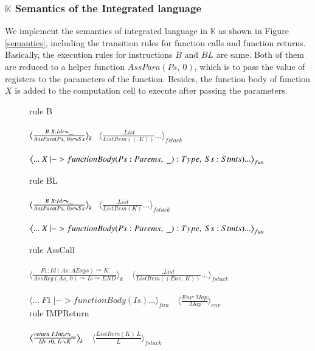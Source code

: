 \documentclass[letterpaper, 10 pt, conference]{IEEEtran}
\begin{document}
\subsubsection{$\mathbb{K}$ Semantics of the Integrated language}
\par We implement the semantics of integrated language in $\mathbb{K}$ as shown in Figure \ref{semantics}, including the transition rules for function calls and function returns. Basically, the execution rules for instructions $B$ and $BL$ are same. Both of them are reduced to a helper function $AssPara(Ps,~0)$, which is to pass the value of registers to the parameters of the function. Besides, the function body of function $X$ is added to the computation cell to execute after passing the parameters.
\begin{figure}
rule B\\ \\
$\big\langle\frac{B~X:Id\curvearrowright \underline{\hbox to 2mm{}}}{AssPara(Ps,~0)\curvearrowright Ss}\big\rangle_k$$~~~\big\langle\frac{.List}{ListItem((.K))}...\big\rangle_{fstack}$\\ \\
$\big\langle ...~ X ~|-> functionBody(Ps:Parems,~\underline{\hbox to 2mm{}}):Type,~Ss:Stmts) ...\big\rangle_{fun}\\$

rule BL\\ \\
$\big\langle\frac{B~X:Id\curvearrowright \underline{\hbox to 2mm{}}}{AssPara(Ps,~0)\curvearrowright Ss}\big\rangle_k$$~~~\big\langle\frac{.List}{ListItem(K)}...\big\rangle_{fstack}$\\ \\
$\big\langle ...~ X ~|-> functionBody(Ps:Parems,~\underline{\hbox to 2mm{}}):Type,~Ss:Stmts) ...\big\rangle_{fun}\\$

rule AssCall\\ \\
$\big\langle\frac{F1:Id(As:AExps)\curvearrowright K}{AssReg(As,~0)\curvearrowright Is\curvearrowright END}\big\rangle_k$
$~~~\big\langle\frac{.List}{ListItem((Env,~K))}...\big\rangle_{fstack}$\\ \\
$\big\langle ... ~F1~|->functionBody(Is) ...\big\rangle_{fun}$ $~~~\big\langle\frac{Env:Map}{.Map}\big\rangle_{env}$\\

rule IMPReturn\\ \\
$\big\langle\frac{return~I:Int;\curvearrowright \underline{\hbox to 2mm{}}}{ldr~r0,~I\curvearrowright K}\big\rangle_k$
$~~~\big\langle\frac{ListItem(K)~L}{L}\big\rangle_{fstack}$\\


\end{figure}
\end{document}
